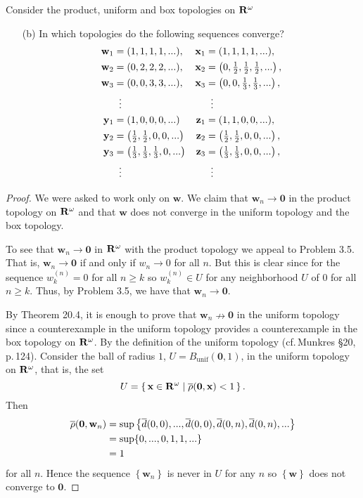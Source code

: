 \newpage
\begin{problem}[Munkres \S20, p.\,127, \#4(b)]
Consider the product, uniform and box topologies on $\mathbf{R}^\omega$
\begin{enumerate}[noitemsep]
\item[(b)] In which topologies do the following sequences converge?
\begin{align*}
\mathbf{w}_1&=(1,1,1,1,...),&\mathbf{x}_1&=(1,1,1,1,...),\\
\mathbf{w}_2&=(0,2,2,2,...),&\mathbf{x}_2&=\left(0,\tfrac{1}{2},\tfrac{1}{2},\tfrac{1}{2},...\right),\\
\mathbf{w}_3&=(0,0,3,3,...),&\mathbf{x}_3&=\left(0,0,\tfrac{1}{3},\tfrac{1}{3},...\right),\\
&\vdotswithin{=}&&\vdotswithin{=}\\
\mathbf{y}_1&=(1,0,0,0,...)&\mathbf{z}_1&=(1,1,0,0,...),\\
\mathbf{y}_2&=\left(\tfrac{1}{2},\tfrac{1}{2},0,0,...\right)&\mathbf{z}_2&=\left(\tfrac{1}{2},\tfrac{1}{2},0,0,...\right),\\
\mathbf{y}_3&=\left(\tfrac{1}{3},\tfrac{1}{3},\tfrac{1}{3},0,...\right)&\mathbf{z}_3&=\left(\tfrac{1}{3},\tfrac{1}{3},0,0,...\right),\\
&\vdotswithin{=}&&\vdotswithin{=}
\end{align*}
\end{enumerate}
\end{problem}
\begin{proof}
We were asked to work only on $\mathbf{w}$. We claim that
$\mathbf{w}_n\to\mathbf{0}$ in the product topology on $\mathbf{R}^\omega$
and that $\mathbf{w}$ does not converge in the uniform topology
and the box topology.

To see that $\mathbf{w}_n\to\mathbf{0}$ in $\mathbf{R}^\omega$ with the
product topology we appeal to Problem 3.5. That is,
$\mathbf{w}_n\to\mathbf{0}$ if and only if $w_n\to 0$ for all
$n$. But this is clear since for the sequence $w_k^{(n)}=0$ for
all $n\geq k$ so $w_k^{(n)}\in U$ for any neighborhood $U$ of $0$
for all $n\geq k$. Thus, by Problem 3.5, we have that
$\mathbf{w}_n\to\mathbf{0}$.

By Theorem 20.4, it is enough to prove that
$\mathbf{w}_n\nrightarrow\mathbf{0}$ in the uniform topology since
a counterexample in the uniform topology provides a
counterexample in the box topology on $\mathbf{R}^\omega$. By the
definition of the uniform topology (cf.\,Munkres \S20,
p.\,124). Consider the ball of radius $1$,
$U=B_{\text{unif}}(\mathbf{0},1)$, in the uniform topology on
$\mathbf{R}^\omega$, that is, the set
\[
U
=\left\{\,\mathbf{x}\in\mathbf{R}^\omega\;\middle|\;
\overline{\rho}(\mathbf{0},\mathbf{x})<1\,\right\}.
\]
Then
\begin{align*}
\overline{\rho} (\mathbf{0},\mathbf{w}_n)
&=\sup\left\{\overline{d}(0,0),...,\overline{d}(0,0),\overline{d}(0,n),\overline{d}(0,n),...\right\}\\
&=\sup\{0,...,0,1,1,...\}\\
&=1
\end{align*}
for all $n$. Hence the sequence $\left\{\mathbf{w}_n\right\}$ is
never in $U$ for any $n$ so $\left\{\mathbf{w}\right\}$ does not
converge to $\mathbf{0}$.
\end{proof}
